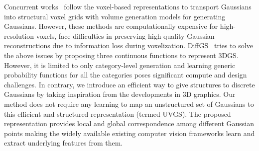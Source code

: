 Concurrent works~\cite{gaussiancube2024, gvgen2025} follow the voxel-based representations to transport Gaussians into structural voxel grids with volume generation models for generating Gaussians. However, these methods are computationally expensive for high-resolution voxels, face difficulties in preserving high-quality Gaussian reconstructions due to information loss during voxelization. 
DiffGS~\cite{diffgs2024} tries to solve the above issues by proposing three continuous functions to represent 3DGS. However, it is limited to only category-level generation and learning generic probability functions for all the categories poses significant compute and design challenges.
%
In contrary, we introduce an efficient way to give structures to discrete Gaussians by taking inspiration from the developments in 3D graphics. 
Our method does not require any learning to map an unstructured set of Gaussians to this efficient and structured representation (termed UVGS). 
The proposed representation provides local and global correspondence among different Gaussian points making the widely available existing computer vision frameworks learn and extract underlying features from them.